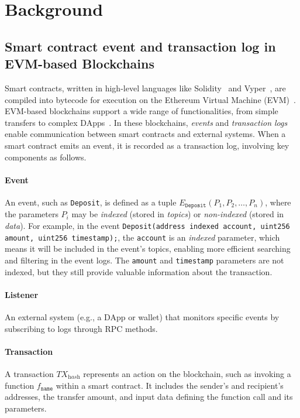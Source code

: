 \section{Background}\label{sec:Background}

\subsection{Smart contract event and transaction log in EVM-based Blockchains}
Smart contracts, written in high-level languages like Solidity~\cite{Solidity} and Vyper~\cite{Vyper}, are compiled into bytecode for execution on the Ethereum Virtual Machine (EVM)~\cite{EVM}. EVM-based blockchains support a wide range of functionalities, from simple transfers to complex DApps~\cite{DApp}. In these blockchains, \textit{events} and \textit{transaction logs} enable communication between smart contracts and external systems. When a smart contract emits an event, it is recorded as a transaction log, involving key components as follows.

\paragraph{Event}
An event, such as \texttt{Deposit}, is defined as a tuple $E_{\texttt{Deposit}}(P_1, P_2, \ldots, P_n)$, where the parameters $P_i$ may be \textit{indexed} (stored in \textit{topics}) or \textit{non-indexed} (stored in \textit{data}). For example, in the event
\texttt{Deposit(address indexed account, uint256 amount, uint256 timestamp);},
the \texttt{account} is an \textit{indexed} parameter, which means it will be included in the event's topics, enabling more efficient searching and filtering in the event logs. The \texttt{amount} and \texttt{timestamp} parameters are not indexed, but they still provide valuable information about the transaction.


\paragraph{Listener}
An external system (e.g., a DApp or wallet) that monitors specific events by subscribing to logs through RPC methods.

\paragraph{Transaction}
A transaction $TX_{\textit{hash}}$ represents an action on the blockchain, such as invoking a function $f_{\texttt{name}}$ within a smart contract. It includes the sender’s and recipient’s addresses, the transfer amount, and input data defining the function call and its parameters.


